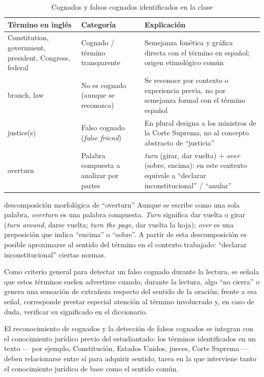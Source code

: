 \documentclass[12pt,oneside]{book}
\begin{document}
\begin{table}[H]
\centering
\caption{Cognados y falsos cognados identificados en la clase}
\begin{tabularx}{\textwidth}{>{\raggedright\arraybackslash}p{} >{\raggedright\arraybackslash}p{} >{\raggedright\arraybackslash}X}
\toprule
\textbf{Término en inglés} & \textbf{Categoría} & \textbf{Explicación} \\
\midrule
Constitution, government, president, Congress, federal & Cognado / término transparente & Semejanza fonética y gráfica directa con el término en español; origen etimológico común \\
branch, law & No es cognado (aunque se reconozca) & Se reconoce por contexto o experiencia previa, no por semejanza formal con el término español \\
justice(s) & Falso cognado (\textit{false friend}) & En plural designa a los ministros de la Corte Suprema, no al concepto abstracto de ``justicia'' \\
overturn & Palabra compuesta a analizar por partes & \textit{turn} (girar, dar vuelta) + \textit{over} (sobre, encima): en este contexto equivale a ``declarar inconstitucional'' / ``anular'' \\
\bottomrule
\end{tabularx}
\end{table}

\begin{example}{descomposición morfológica de ``overturn''}
Aunque se escribe como una sola palabra, \textit{overturn} es una palabra compuesta. \textit{Turn} significa dar vuelta o girar (\textit{turn around}, darse vuelta; \textit{turn the page}, dar vuelta la hoja); \textit{over} es una preposición que indica ``encima'' o ``sobre''. A partir de esta descomposición es posible aproximarse al sentido del término en el contexto trabajado: ``declarar inconstitucional'' ciertas normas.
\end{example}

Como criterio general para detectar un falso cognado durante la lectura, se señala que estos términos suelen advertirse cuando, durante la lectura, algo ``no cierra'' o genera una sensación de extrañeza respecto del sentido de la oración; frente a esa señal, corresponde prestar especial atención al término involucrado y, en caso de duda, verificar su significado en el diccionario.

\begin{note}
El reconocimiento de cognados y la detección de falsos cognados se integran con el conocimiento jurídico previo del estudiantado: los términos identificados en un texto --- por ejemplo, Constitución, Estados Unidos, jueces, Corte Suprema --- deben relacionarse entre sí para adquirir sentido, tarea en la que interviene tanto el conocimiento jurídico de base como el sentido común.
\end{note}
\end{document}
